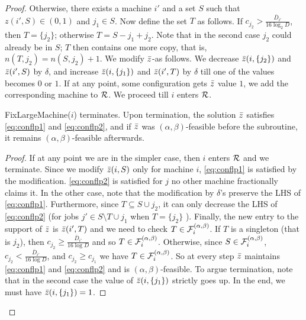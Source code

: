 \documentclass{article}[11pt]
\newcommand{\barD}{\bar{D}}
\begin{document}
\begin{proof}
	Otherwise, there exists a machine $i'$ 
	and a set $S$ such that $z(i',S) \in (0,1)$ and $j_1 \in S$. 
	Now define the set $T$ as follows. If $c_{j_2} > \frac{\barD_{i'}}{16\log_2 D}$, then $T = \{j_2\}$; otherwise $T = S - j_1 + j_2$. 
	Note that in the second case $j_2$ could already be in $S$; $T$ then contains one more copy, that is, $n(T,j_2) = n(S,j_2) + 1$.
	We modify $\bar z$-as follows. We decrease $\bar z(i,\{j_2\})$ and $\bar z(i',S)$ by $\delta$, and increase $\bar z(i,\{j_1\})$ and $\bar z(i',T)$ by $\delta$ till one of the values becomes $0$ or $1$. 
	If at any point, some configuration gets $\bar z$ value $1$, we add the corresponding machine to ${\cal R}$.
	We proceed till $i$ enters ${\cal R}$.
	
	\begin{claim}\label{clm:002}
		{\sf FixLargeMachine}($i$) terminates. Upon termination, the solution $\bar z$ satisfies \eqref{eq:conflp1} and \eqref{eq:conflp2}, and
		if $\bar z$ was $(\alpha,\beta)$-feasible before the subroutine, it remains $(\alpha,\beta)$-feasible afterwards.
	\end{claim}
	\begin{proof}
		If at any point we are in the simpler case, then $i$ enters ${\cal R}$ and we terminate. Since we modify $\bar z(i,S)$ only for machine $i$, \eqref{eq:conflp1} is satisfied by the modification.
		\eqref{eq:conflp2} is satisfied for $j$ no other machine fractionally claims it. In the other case, note that the modification by $\delta$'s preserve the LHS of \eqref{eq:conflp1}. Furthermore, since $T\subseteq S\cup j_2$, it can only 
		decrease the LHS of \eqref{eq:conflp2} (for jobs $j' \in S\setminus T\cup j_1$ when $T=\{j_2\}$ ). Finally, the new entry to the support of $\bar z$ is $\bar z(i',T)$ and we need to check $T\in {\cal F}^{(\alpha,\beta)}_i$.
		If $T$ is a singleton (that is $j_2$), then $c_{j_2} \geq \frac{\barD_{i'}}{16\log D}$ and so $T\in {\cal F}^{(\alpha,\beta)}_i$.
		Otherwise, since $S\in {\cal F}^{(\alpha,\beta)}_i$, $c_{j_2} <  \frac{\barD_{i'}}{16\log D}$, and $c_{j_2} \geq c_{j_1}$ we have $T\in {\cal F}^{(\alpha,\beta)}_i$. 
		So at every step $\bar z$ maintains \eqref{eq:conflp1} and \eqref{eq:conflp2} and is $(\alpha,\beta)$-feasible. To argue termination, note that in the second case the value of $\bar z(i,\{j_1\})$ strictly goes up.
		In the end, we must have $\bar z(i,\{j_1\}) = 1$.
	\end{proof}
	

\end{proof}
\end{document}
